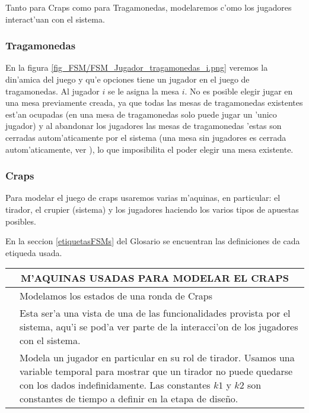 \newcommand{\ronda}{\italica{FSM Ronda}}
\newcommand{\crupier}{\italica{FSM Crupier}}
\newcommand{\tirador}{\italica{FSM Tirador i}}
\newcommand{\dados}{\italica{FSM Dados i}}
\newcommand{\campo}{\italica{FSM Jugador i haciendo apuesta de Campo }}
\newcommand{\sitio}{\italica{FSM Jugador i haciendo apuesta de sitio}}
\newcommand{\pase}{\italica{FSM Jugador i haciendo apuesta linea de pase / Barra NoPase}}
\newcommand{\venir}{\italica{FSM Jugador i haciendo apuesta venir novenir}}

Tanto para Craps como para Tragamonedas, modelaremos c'omo los jugadores interact'uan con el sistema.

\subsubsection{Tragamonedas}

En la figura \ref{fig_FSM/FSM_Jugador_tragamonedas_i.png} veremos la din'amica del juego y qu'e opciones tiene un jugador en el juego de tragamonedas.
Al jugador $i$ se le asigna la mesa $i$. No es posible elegir jugar en una mesa previamente creada, ya que todas las mesas de tragamonedas existentes est'an ocupadas (en una mesa de tragamonedas solo puede jugar un 'unico jugador) y al abandonar los jugadores las mesas de tragamonedas 'estas son cerradas autom'aticamente por el sistema (una mesa sin jugadores es cerrada autom'aticamente, ver ), lo que imposibilita el poder elegir una mesa existente.

\clearpage


\subsubsection{Craps}
\label{FSM:Craps}
Para modelar el juego de craps usaremos varias m'aquinas, en particular:
el tirador, el crupier (sistema) y los jugadores haciendo los varios tipos de apuestas
posibles. 

En la seccion \ref{etiquetasFSMs} del Glosario se encuentran las definiciones de cada etiqueda usada.

 
\begin{center}
\begin{tabular}{p{4cm}|p{12cm}}        
         \multicolumn{2}{c}{M'AQUINAS USADAS PARA MODELAR EL CRAPS}     \\
        \hline
        \ronda & Modelamos los estados de una ronda de Craps \\
        \hline
        \crupier & Esta ser'a una vista de una de las funcionalidades provista por el sistema, aqu'i se pod'a ver parte de la interacci'on de los jugadores con el sistema. \\
         \hline 
         \tirador  & Modela un jugador en particular en su rol de tirador. Usamos una variable temporal para mostrar que un tirador no puede quedarse con los dados indefinidamente. Las constantes $k1$ y $k2$ son constantes de tiempo a definir en la etapa de dise\~{n}o.\\
\end{tabular}
\end{center}

